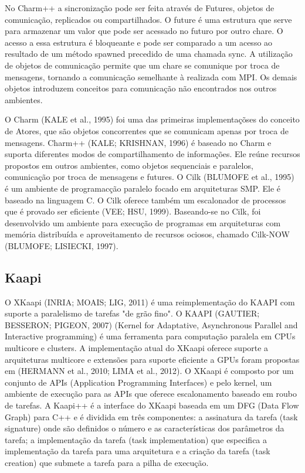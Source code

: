 No Charm++ a sincronização pode ser feita através de Futures, objetos de comunicação, replicados ou compartilhados. O future  é uma estrutura que serve para armazenar um valor que pode ser acessado no futuro por outro chare. O acesso a essa estrutura  é bloqueante e pode ser comparado a um acesso ao resultado de um método spawned precedido de uma chamada sync. A utilização de objetos de comunicação permite que um chare se comunique por troca de mensagens, tornando a comunicação semelhante à realizada com MPI. Os demais objetos introduzem conceitos para comunicação não encontrados nos outros ambientes.

O Charm (KALE et al., 1995) foi uma das primeiras implementaçõses do conceito de Atores, que são objetos concorrentes que se comunicam apenas por troca de mensagens. Charm++ (KALE; KRISHNAN, 1996) é baseado no Charm e suporta diferentes modos de compartilhamento de informações. Ele reúne recursos propostos em outros ambientes, como objetos sequenciais e paralelos, comunicação por troca de mensagens e futures. O Cilk (BLUMOFE et al., 1995)  é um ambiente de programacção paralelo focado em arquiteturas SMP. Ele  é baseado na linguagem C. O Cilk oferece também um escalonador de processos que é provado ser eficiente (VEE; HSU, 1999). Baseando-se no Cilk, foi desenvolvido um ambiente para execução de programas em arquiteturas com memória distribuída e aproveitamento de recursos ociosos, chamado Cilk-NOW (BLUMOFE; LISIECKI, 1997).

\subsection{Kaapi}

O XKaapi (INRIA; MOAIS; LIG, 2011) é uma reimplementação do KAAPI com suporte a paralelismo de tarefas "de grão fino". O KAAPI (GAUTIER; BESSERON; PIGEON, 2007) (Kernel for Adaptative, Asynchronous Parallel and Interactive programming) é uma ferramenta para computação paralela em CPUs multicore e clusters. A implementação atual do XKaapi oferece suporte a arquiteturas multicore e extensões para suporte eficiente a GPUs foram propostas em (HERMANN et al., 2010; LIMA et al., 2012). O XKaapi é composto por um conjunto de APIs (Application Programming Interfaces) e pelo kernel, um ambiente de execução para as APIs que oferece escalonamento baseado em roubo de tarefas. A Kaapi++ é a interface do XKaapi baseada em um DFG (Data Flow Graph) para C++ e é dividida em três componentes: a assinatura da tarefa (task signature) onde são definidos o número e as características dos parâmetros da tarefa; a implementação da tarefa (task implementation) que especifica a implementação da tarefa para uma arquitetura e a criação da tarefa (task creation) que submete a tarefa para a pilha de execução.

